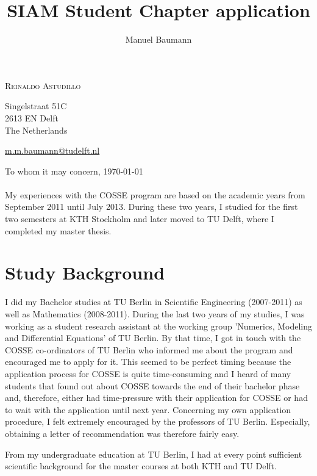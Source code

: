 \documentclass{article}
\title{\bf SIAM Student Chapter application }
\author{Manuel Baumann}
\begin{document}
\hfill \textsc{Reinaldo Astudillo}

\hfill Singelstraat 51C \\
\hfill 2613 EN Delft \\
\hfill The Netherlands \\
\hfill

\hfill \href{mailto:m.m.baumann@tudelft.nl}{m.m.baumann@tudelft.nl}


\vspace{2cm}

To whom it may concern, \hfill \today
\\ \\
My experiences with the COSSE program are based on the academic years from September 2011 until July 2013. During these two years, I studied for the first two semesters at KTH Stockholm and later moved to TU Delft, where I completed my master thesis.
\section*{Study Background}
I did my Bachelor studies at TU Berlin in Scientific Engineering (2007-2011) as well as Mathematics (2008-2011). During the last two years of my studies, I was working as a student research assistant at the working group 'Numerics, Modeling and Differential Equations' of TU Berlin. By that time, I got in touch with the COSSE co-ordinators of TU Berlin who informed me about the program and encouraged me to apply for it. This seemed to be perfect timing because the application process for COSSE is quite time-consuming and I heard of many students that found out about COSSE towards the end of their bachelor phase and, therefore, either had time-pressure with their application for COSSE or had to wait with the application until next year. Concerning my own application procedure, I felt extremely encouraged by the professors of TU Berlin. Especially, obtaining a letter of recommendation was therefore fairly easy.

From my undergraduate education at TU Berlin, I had at every point sufficient scientific background for the master courses at both KTH and TU Delft.
\end{document}
